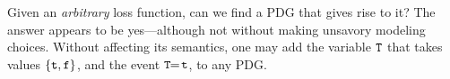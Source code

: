 \documentclass[twoside]{article}
\theoremstyle{plain}
\theoremstyle{definition}
\begin{document}
Given an \emph{arbitrary} loss function, can we find a PDG that gives rise to it?
The answer appears to be yes---although not without making unsavory modeling choices.
%
%
%
%
Without affecting its semantics, one may add the variable ${\tt T}$ that takes values $\{{\tt t}, {\tt f}\}$, and the event ${\tt T} \!\!=\! {\tt t}$, to any PDG.
%
\end{document}
